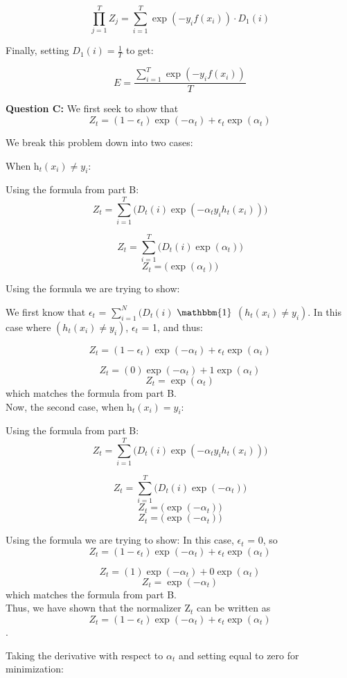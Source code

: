 \documentclass[12 pt]{article}
\begin{document}
	\[ \prod_{j = 1}^{T} Z_j = \sum_{i = 1}^T \exp(-y_i f(x_i)) \cdot D_1(i) \]
	
	Finally, setting $D_1(i) = \frac{1}{T}$ to
	get:
	
	\[ E = \frac{\sum_{i = 1}^T \exp(-y_i f(x_i))} {T}\]
	
	
	
	
	\noindent\textbf{Question C:} 
	\noindent We first seek to show that 
	\[Z_t = (1 -\epsilon_t)\exp(-\alpha_t) + \epsilon_t \exp(\alpha_t)\] 
	
	We break this problem down into two cases:
	
	When h$_{t}(x_i) \neq y_i$:
	
	Using the formula from part B: 	\[ Z_t = \sum_{i = 1}^T \Big( D_t(i)\exp(-\alpha_t y_i h_t (x_i))\Big) \]
	
	\[ Z_t = \sum_{i = 1}^T \Big( D_t(i)\exp(\alpha_t)\Big) \]
	\[ Z_t = \Big(\exp(\alpha_t)\Big) \]
	
	Using the formula we are trying to show:
	
	We first know that $\epsilon_t$ = $\sum_{i=1} ^ N (D_t(i)$ $\mathbbm{1}$ $(h_t(x_i) \neq y_i)$. In this case where  $(h_t(x_i) \neq y_i)$, $\epsilon_t$ = 1, and thus:
	
	\[Z_t = (1 -\epsilon_t)\exp(-\alpha_t) + \epsilon_t \exp(\alpha_t)\] 
		
	\[Z_t = (0)\exp(-\alpha_t) + 1 \exp(\alpha_t)\] 
	\[Z_t = \exp(\alpha_t)\] which matches the formula from part B.\\
	
	Now, the second case, when h$_{t}(x_i) = y_i$:
	
	Using the formula from part B: 	\[ Z_t = \sum_{i = 1}^T \Big( D_t(i)\exp(-\alpha_t y_i h_t (x_i))\Big) \]
		
		\[ Z_t = \sum_{i = 1}^T \Big( D_t(i)\exp(-\alpha_t)\Big) \]
		\[ Z_t = \Big(\exp(-\alpha_t)\Big) \]
		\[ Z_t = \Big(\exp(-\alpha_t)\Big) \]
		
	Using the formula we are trying to show: 
	In this case, $\epsilon_t$ = 0, so 
		\[Z_t = (1 -\epsilon_t)\exp(-\alpha_t) + \epsilon_t \exp(\alpha_t)\] 
	
	\[Z_t = (1)\exp(-\alpha_t) + 0 \exp(\alpha_t)\] 
	\[Z_t = \exp(-\alpha_t)\] which matches the formula from part B.\\
	
	Thus, we have shown that the normalizer Z$_t$ can be written as 	\[Z_t = (1 -\epsilon_t)\exp(-\alpha_t) + \epsilon_t \exp(\alpha_t)\].
	
	Taking the derivative with respect to $\alpha_t$ and setting equal to zero for minimization:
	
\end{document}
